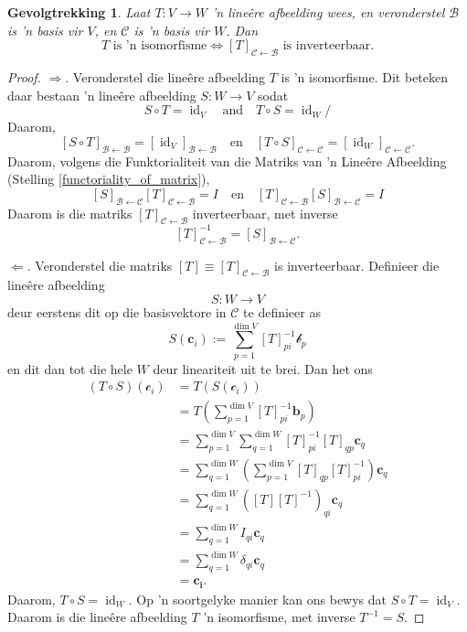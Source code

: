 \documentclass[a4paper,11pt]{book}
\newtheorem{corollary}[theorem]{Gevolgtrekking}
\theoremstyle{definition}
\newcommand{\ve}[1]{\mathbf{#1}}
\newcommand{\basis}[1]{{\mathcal #1}}
\DeclareMathOperator{\id}{id}
\begin{document}
\begin{corollary} \label{map-iso-matrix-iso}Laat $T : V \rightarrow W$ 'n
	line{\^e}re afbeelding wees, en veronderstel $\basis{B}$ is 'n basis
	vir $V$, en $\basis{C}$ is 'n basis vir $W$. Dan
	\[
		\mbox{$T$ is 'n isomorfisme} \Longleftrightarrow
		\mbox{$[T]_{\basis{C} \leftarrow \basis{B}}$ is inverteerbaar.}
	\]
\end{corollary}
\begin{proof} $\Rightarrow$. Veronderstel die line{\^e}re afbeelding $T$ is
	'n isomorfisme. Dit beteken daar bestaan 'n line{\^e}re afbeelding $S :
	W \rightarrow V$ sodat
	\[
		S \circ T = \id_V \quad \text{and} \quad T \circ S = \id_W/
	\]
	Daarom,
	\[
		[S \circ T]_{\basis{B} \leftarrow \basis{B}} = [\id_V]_{\basis{B}
		\leftarrow \basis{B}} \quad \text{en} \quad [T \circ S]_{\basis{C}
		\leftarrow \basis{C}} = [\id_W]_{\basis{C} \leftarrow \basis{C}}.
	\]
	Daarom, volgens die Funktorialiteit van die Matriks van 'n Line{\^e}re
	Afbeelding (Stelling  \ref{functoriality_of_matrix}), 
	\[
		[S]_{\basis{B} \leftarrow \basis{C}} [T]_{\basis{C} \leftarrow
		\basis{B}} = I \quad \text{en} \quad [T]_{\basis{C} \leftarrow
		\basis{B}} [S]_{\basis{B} \leftarrow \basis{C}} = I
	\]
	Daarom is die matriks $[T]_{\basis{C} \leftarrow \basis{B}}$
	inverteerbaar, met inverse
	\[
		[T]^{-1}_{\basis{C} \leftarrow \basis{B}} = [S]_{\basis{B}
		\leftarrow \basis{C}}.
	\]

	$\Leftarrow$. Veronderstel die matriks $[T] \equiv [T]_{\basis{C}
	\leftarrow \basis{B}}$ is inverteerbaar. Definieer die line{\^e}re
	afbeelding
	\[
		S : W \rightarrow V
	\]
	deur eerstens dit op die basisvektore in $\basis{C}$ te definieer as
	\[
		S(\ve{c}_i) := \sum_{p=1}^{\dim V} [T]^{-1}_{pi} \basis{b}_p
	\]
	en dit dan tot die hele $W$ deur lineariteit uit te brei. Dan het ons
	\begin{align*}
		(T \circ S)(\basis{c}_i) &= T(S(\basis{c}_i)) \\
		&= T\left( \sum_{p=1}^{\dim V} [T]_{pi}^{-1} \ve{b}_p \right) \\
		&= \sum_{p=1}^{\dim V} \sum_{q=1}^{\dim W} [T]^{-1}_{pi} [T]_{qp}
		\ve{c}_q \\
		&= \sum_{q=1}^{\dim W} \left( \sum_{p=1}^{\dim V} [T]_{qp}
		[T]^{-1}_{pi} \right) \ve{c}_q \\
		&= \sum_{q=1}^{\dim W} \left( [T] [T]^{-1} \right)_{qi} \ve{c}_q \\
		&= \sum_{q=1}^{\dim W} I_{qi} \ve{c}_q \\
		&= \sum_{q=1}^{\dim W} \delta_{qi} \ve{c}_q \\
		&= \ve{c_i}.
	\end{align*}
	Daarom, $T \circ S = \id_W$. Op 'n soortgelyke manier kan ons bewys dat
	$S \circ T = \id_V$. Daarom is die line{\^e}re afbeelding $T$ 'n
	isomorfisme, met inverse $T^{-1} = S$.
\end{proof}
\end{document}
